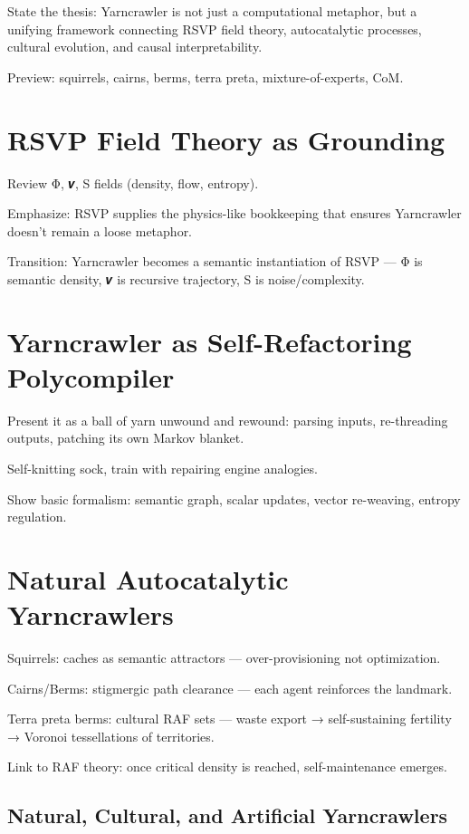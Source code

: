\documentclass{article}
\begin{document}
State the thesis: Yarncrawler is not just a computational metaphor, but a unifying framework connecting RSVP field theory, autocatalytic processes, cultural evolution, and causal interpretability.

Preview: squirrels, cairns, berms, terra preta, mixture-of-experts, CoM.

\section{RSVP Field Theory as Grounding}

Review Φ, 𝒗, S fields (density, flow, entropy).

Emphasize: RSVP supplies the physics-like bookkeeping that ensures Yarncrawler doesn’t remain a loose metaphor.

Transition: Yarncrawler becomes a semantic instantiation of RSVP — Φ is semantic density, 𝒗 is recursive trajectory, S is noise/complexity.

\section{Yarncrawler as Self-Refactoring Polycompiler}

Present it as a ball of yarn unwound and rewound: parsing inputs, re-threading outputs, patching its own Markov blanket.

Self-knitting sock, train with repairing engine analogies.

Show basic formalism: semantic graph, scalar updates, vector re-weaving, entropy regulation.

\section{Natural Autocatalytic Yarncrawlers}

Squirrels: caches as semantic attractors — over-provisioning not optimization.

Cairns/Berms: stigmergic path clearance — each agent reinforces the landmark.

Terra preta berms: cultural RAF sets — waste export → self-sustaining fertility → Voronoi tessellations of territories.

Link to RAF theory: once critical density is reached, self-maintenance emerges.

\subsection{Natural, Cultural, and Artificial Yarncrawlers}
\end{document}
